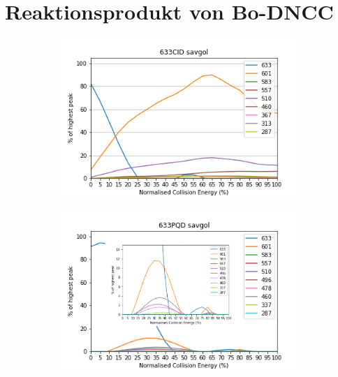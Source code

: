 \pagebreak
\section{Reaktionsprodukt von Bo-DNCC}

\begin{figure}[!htbp]
  \begin{subfigure}[b]{0.5\textwidth}
    \includegraphics[width=\textwidth]{content/Anhang/ESIMS/RP_Bo-DNCC/633CID-633savgol.png}
    \caption{}
  \end{subfigure}
  \hfill
  \begin{subfigure}[b]{0.5\textwidth}
    \includegraphics[width=\textwidth]{content/Anhang/ESIMS/RP_Bo-DNCC/633PQD-633savgol_pic.png}
    \caption{}
  \end{subfigure}
  

\end{figure}
